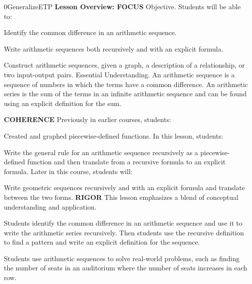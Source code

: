 \documentclass{article}
\newenvironment{te-addendum}[2]{}{}     %
\newcommand{\te}[1]{}                   %
\begin{document}
\begin{te-addendum}{0}{GeneralizeETP}
\textbf{Lesson Overview: FOCUS}
Objective. Students will be able to:
\item Identify the common difference in an arithmetic sequence.
\item Write arithmetic sequences both recursively and with an explicit formula.
\item Construct arithmetic sequences, given a graph, a description of a relationship, or two input-output pairs.
Essential Understanding. An arithmetic sequence is a sequence of numbers in which the terms have a common difference. An arithmetic series is the sum of the terms in an infinite arithmetic sequence and can be found using an explicit definition for the sum.
\te{Printed infinite; likely finite, consistent with the finite sums taught in this lesson.}
\textbf{COHERENCE}
Previously in earlier courses, students:
\item Created and graphed piecewise-defined functions.
In this lesson, students:
\item Write the general rule for an arithmetic sequence recursively as a piecewise-defined function and then translate from a recursive formula to an explicit formula.
Later in this course, students will:
\item Write geometric sequences recursively and with an explicit formula and translate between the two forms.
\textbf{RIGOR}
This lesson emphasizes a blend of conceptual understanding and application.
\item Students identify the common difference in an arithmetic sequence and use it to write the arithmetic series recursively. Then students use the recursive definition to find a pattern and write an explicit definition for the sequence.
\te{Printed arithmetic series recursively; likely arithmetic sequence recursively.}
\item Students use arithmetic sequences to solve real-world problems, such as finding the number of seats in an auditorium where the number of seats increases in each row.
\end{te-addendum}
\end{document}
